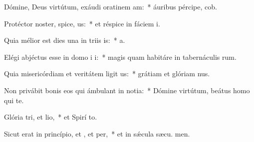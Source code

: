 \item Dómine, Deus virtútum, exáudi oratinem am:~* áuribus pércipe,  cob.
\item Protéctor noster, spice, us:~* et réspice in fáciem  i.
\item Quia mélior est dies una in triis is:~*  a.
\item Elégi abjéctus esse in domo i i:~* magis quam habitáre in tabernáculis rum.
\item Quia misericórdiam et veritátem ligit us:~* grátiam et glóriam  nus.
\item Non privábit bonis eos qui ámbulant in notia:~* Dómine virtútum, beátus homo qui   te.
\item Glória tri, et lio,~* et Spirí to.
\item Sicut erat in princípio, et , et per,~* et in sǽcula sæcu. men.
